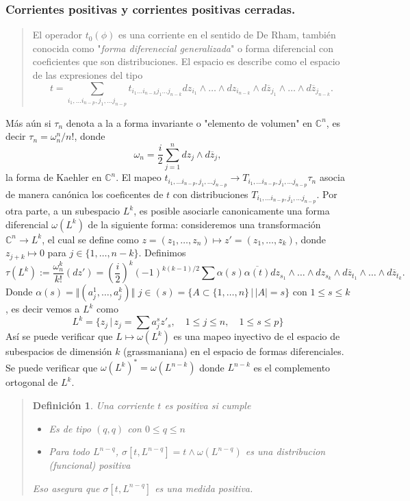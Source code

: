 \documentclass[letterpaper]{article}
\newtheorem{def.}{Definici\'on}[section]
\newcommand{\con}{\ensuremath{\mathbb{C}^n}}
\begin{document}
\subsubsection{Corrientes positivas y corrientes positivas cerradas.}
\label{sec:org4d920d0}
\begin{quote}
El operador \(t_0(\phi)\) es una corriente en el sentido de De Rham, también conocida como "\emph{forma diferenecial generalizada}" o forma diferencial con coeficientes que son distribuciones. El espacio es describe como el espacio de las expresiones del tipo
\[
    t=\sum_{i_1,\dots i_{n-p},j_1,\dots j_{n-p}}t_{i_1\dots i_{n-k}j_1\dots j_{n-k}} dz_{i_1}\wedge\dots\wedge dz_{i_{n-k}}\wedge d\overline{z}_{j_1}\wedge\dots\wedge d\overline{z}_{j_{n-k}}.
\]
\end{quote}
Más aún si \(\tau_n\) denota a la a forma invariante o "elemento de volumen" en \(\con\), es decir \(\tau_n=\omega_n^n/n!\), donde
\[
    \omega_n=\frac{i}{2}\sum_{j=1}^n dz_j\wedge d\overline{z}_j,
\]
la forma de Kaehler en \(\con\). El mapeo \(t_{i_1,\dots i_{n-p},j_1,\dots j_{n-p}}\rightarrow T_{i_1,\dots i_{n-p},j_1,\dots j_{n-p}}\tau_n\) asocia de manera canónica los coeficentes de \(t\) con distribuciones \(T_{i_1,\dots i_{n-p},j_1,\dots j_{n-p}}\). Por otra parte, a un subespacio \(L^k\), es posible asociarle canonicamente una forma diferencial \(\omega(L^k)\) de la siguiente forma: consideremos una transformación \(\con\rightarrow L^k\), el cual se define como \(z=(z_1,\dots,z_n)\mapsto z'=(z_1,\dots,z_k)\), donde \(z_{j+k}\mapsto 0\) para \(j\in\{1,\dots,n-k\}\). Definimos
\[
    \tau(L^k):=\frac{\omega_n^k}{k!}(dz')=(\frac{i}{2})^k(-1)^{k(k-1)/2}\sum \alpha(s)\overline{\alpha(t)}dz_{s_1}\wedge\dots\wedge dz_{s_k}\wedge d\overline{z}_{t_1}\wedge \dots\wedge d\overline{z}_{t_k}.
\]
Donde \(\alpha(s)=\Vert(a^{1}_{j},\dots,a^{k}_{j})\Vert\) \(j\in(s)=\{A\subset\{1,\dots,n\}\,\vert\, |A|=s\}\) con \(1\leq s\leq k\), es decir vemos a \(L^k\) como
\[
    L^k=\{z_j\,\vert\,z_j=\sum a^{s}_{j}z'_s,\quad 1\leq j\leq n,\quad 1\leq s\leq p \}
\]
Así se puede verificar que \(L\mapsto\omega(L^k)\) es una mapeo inyectivo de el espacio de subespacios de dimensión \(k\) (grassmaniana) en el espacio de formas diferenciales. Se puede verificar que \(\omega(L^k)^{*}=\omega(L^{n-k})\) donde \(L^{n-k}\) es el complemento ortogonal de \(L^k\).
\begin{quote}
\begin{def.}
    Una corriente \(t\) es positiva si cumple
\begin{itemize}
    \item[a] Es de tipo $(q,q)$ con $0\leq q\leq n$
    \item[b] Para todo $L^{n-q}$, $\sigma[t,L^{n-q}]=t\wedge\omega(L^{n-q})$ es una distribucion (funcional) positiva
\end{itemize}
Eso asegura que \(\sigma[t,L^{n-q}]\) es una medida positiva.
\end{def.}
\end{quote}
\end{document}
